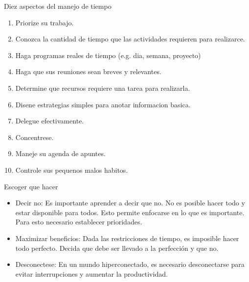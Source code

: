 \documentclass[
10pt,
aspectratio=169,
]{beamer}
\begin{document}
\begin{frame}[c]{Diez aspectos del manejo de tiempo}
\begin{enumerate}
\item Priorize su trabajo.
\item Conozca la cantidad de tiempo que las actividades requieren para realizarce.
\item Haga programas reales de tiempo (e.g. dia, semana, proyecto)
\item Haga que sus reuniones sean breves y relevantes.
\item Determine que recursos requiere una tarea para realizarla.
\item Disene estrategias simples para anotar informacion basica.
\item Delegue efectivamente.
\item Concentrese.
\item Maneje su agenda de apuntes.
\item Controle sus pequenos malos habitos. 
\end{enumerate}
\end{frame}

\begin{frame}[c]{Escoger que hacer}
\begin{itemize}
\item \alert{Decir no}: Es importante aprender a decir que no. No es posible hacer todo y estar disponible para todos. Esto permite enfocarse en lo que es importante. Para esto necesario establecer prioridades.
\item \alert{Maximizar beneficios}: Dada las restricciones de tiempo, es imposible hacer todo perfecto. Decida que debe ser llevado a la perfecci\'on y que no. 
\item \alert{Desconectese}: En un mundo hiperconectado, es necesario desconectarse para evitar interrupciones y aumentar la productividad.
\end{itemize}
\end{frame}
\end{document}
